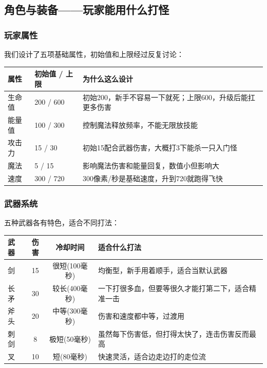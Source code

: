 \documentclass[12pt,a4paper]{article}
\begin{document}
\subsection{角色与装备——玩家能用什么打怪}

\subsubsection{玩家属性}

我们设计了五项基础属性，初始值和上限经过反复讨论：

\begin{table}[htbp]
\centering
\renewcommand{\arraystretch}{1.4}
\begin{tabularx}{\textwidth}{lXX}
\toprule
\textbf{属性} & \textbf{初始值 / 上限} & \textbf{为什么这么设计} \\
\midrule
生命值 & 200 / 600 & 初始200，新手不容易一下就死；上限600，升级后能扛更多伤害 \\
能量值 & 100 / 300 & 控制魔法释放频率，不能无限放技能 \\
攻击力 & 15 / 30 & 初始15配合武器伤害，大概打3下能杀一只入门怪 \\
魔法 & 5 / 15 & 影响魔法伤害和能量回复，数值小但影响大 \\
速度 & 300 / 720 & 300像素/秒是基础速度，升到720就跑得飞快 \\
\bottomrule
\end{tabularx}
\end{table}

\subsubsection{武器系统}

五种武器各有特色，适合不同打法：

\begin{table}[htbp]
\centering
\renewcommand{\arraystretch}{1.4}
\begin{tabularx}{\textwidth}{lccX}
\toprule
\textbf{武器} & \textbf{伤害} & \textbf{冷却时间} & \textbf{适合什么打法} \\
\midrule
剑 & 15 & 很短(100毫秒) & 均衡型，新手用着顺手，适合当默认武器 \\
长矛 & 30 & 较长(400毫秒) & 一下打很多血，但要等很久才能打第二下，适合精准一击 \\
斧头 & 20 & 中等(300毫秒) & 伤害和速度都中等，过渡用 \\
刺剑 & 8 & 极短(50毫秒) & 虽然每下伤害低，但打得太快了，连击伤害反而最高 \\
叉 & 10 & 短(80毫秒) & 快速灵活，适合边走边打的走位流 \\
\bottomrule
\end{tabularx}
\end{table}
\end{document}
